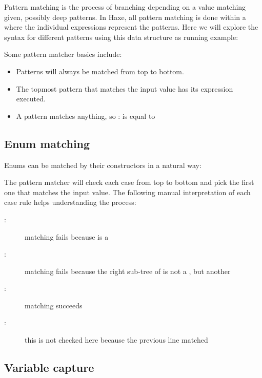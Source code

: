 Pattern matching is the process of branching depending on a value matching given, possibly deep patterns. In Haxe, all pattern matching is done within a  where the individual  expressions represent the patterns. Here we will explore the syntax for different patterns using this data structure as running example:


Some pattern matcher basics include:

\begin{itemize}
	\item Patterns will always be matched from top to bottom.
	\item The topmost pattern that matches the input value has its expression executed.
	\item A \expr{_} pattern matches anything, so : is equal to 
\end{itemize}

\subsection{Enum matching}
\label{lf-pattern-matching-enums}

Enums can be matched by their constructors in a natural way:


The pattern matcher will check each case from top to bottom and pick the first one that matches the input value. The following manual interpretation of each case rule helps understanding the process:

\begin{description}
	\item[:] matching fails because  is a 
	\item[:] matching fails because the right sub-tree of  is not a , but another 
	\item[:] matching succeeds
	\item[:] this is not checked here because the previous line matched
\end{description}

\subsection{Variable capture}
\label{lf-pattern-matching-variable-capture}


